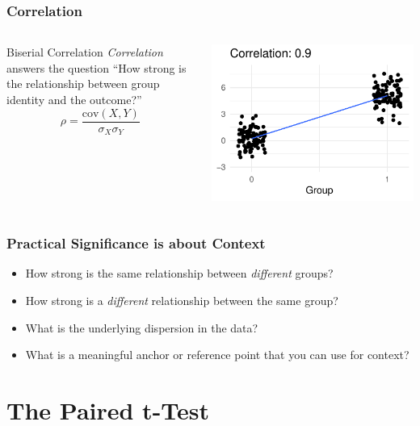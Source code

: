\documentclass[12pt, block=fill]{beamer}
\newcommand{\cov}{\text{cov}}
\begin{document}
\begin{frame}
  \frametitle{Correlation}
  \begin{columns}
  \begin{block}{Biserial Correlation}
    \textit{Correlation} answers the question ``How strong
    is the relationship between group identity and the outcome?''
    \[
      \rho = \frac{\cov(X, Y)}{\sigma_{X}\sigma_{Y}}
    \]
  \end{block}
  \begin{center}
    \includegraphics[width = 0.9\linewidth]{./figures/biserial_09}
  \end{center}
  \end{columns}
\end{frame}

\begin{frame}
  \frametitle{Practical Significance is about Context}

  \begin{itemize}
  \item How strong is the same relationship between \textit{different}
    groups?
  \item How strong is a \textit{different} relationship between the
    same group?
  \item What is the underlying dispersion in the data?
  \item What is a meaningful anchor or reference point that you can
    use for context?
  \end{itemize}
\end{frame}

\section{The Paired t-Test}
\end{document}
